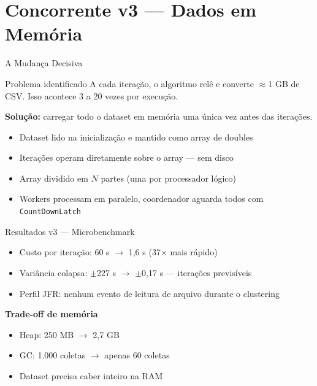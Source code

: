 \section{Concorrente v3 --- Dados em Memória}

\begin{frame}{A Mudança Decisiva}
    \begin{alertblock}{Problema identificado}
        A cada iteração, o algoritmo relê e converte $\approx$1 GB de CSV.
        Isso acontece 3 a 20 vezes por execução.
    \end{alertblock}

    \vspace{0.5em}
    \textbf{Solução:} carregar todo o dataset em memória \alert{uma única vez} antes das iterações.

    \vspace{0.5em}
    \begin{itemize}
        \item Dataset lido na inicialização e mantido como array de doubles
        \item Iterações operam diretamente sobre o array --- sem disco
        \item Array dividido em $N$ partes (uma por processador lógico)
        \item Workers processam em paralelo, coordenador aguarda todos com \texttt{CountDownLatch}
    \end{itemize}
\end{frame}

\begin{frame}{Resultados v3 --- Microbenchmark}
    \begin{itemize}
        \item Custo por iteração: 60 s $\to$ \alert{1,6 s} (\alert{37$\times$} mais rápido)
        \item Variância colapsa: $\pm$227 s $\to$ $\pm$0,17 s --- iterações previsíveis
        \item Perfil JFR: nenhum evento de leitura de arquivo durante o clustering
    \end{itemize}

    \vspace{0.8em}
    \textbf{Trade-off de memória}
    \begin{itemize}
        \item Heap: 250 MB $\to$ \alert{2,7 GB}
        \item GC: 1.000 coletas $\to$ apenas 60 coletas
        \item Dataset precisa caber inteiro na RAM
    \end{itemize}
\end{frame}


